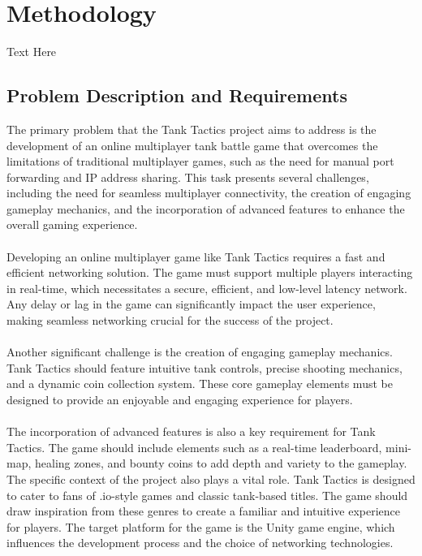 \chapter{Methodology}
\label{ch:method} %
Text Here

\section{Problem Description and Requirements}

The primary problem that the Tank Tactics project aims to address is the development of an online multiplayer tank battle game that overcomes the limitations of traditional multiplayer games, such as the need for manual port forwarding and IP address sharing. This task presents several challenges, including the need for seamless multiplayer connectivity, the creation of engaging gameplay mechanics, and the incorporation of advanced features to enhance the overall gaming experience.
\\
\noindent
\\
Developing an online multiplayer game like Tank Tactics requires a fast and efficient networking solution. The game must support multiple players interacting in real-time, which necessitates a secure, efficient, and low-level latency network. Any delay or lag in the game can significantly impact the user experience, making seamless networking crucial for the success of the project.
\\
\noindent
\\
Another significant challenge is the creation of engaging gameplay mechanics. Tank Tactics should feature intuitive tank controls, precise shooting mechanics, and a dynamic coin collection system. These core gameplay elements must be designed to provide an enjoyable and engaging experience for players.
\\
\noindent
\\
The incorporation of advanced features is also a key requirement for Tank Tactics. The game should include elements such as a real-time leaderboard, mini-map, healing zones, and bounty coins to add depth and variety to the gameplay. The specific context of the project also plays a vital role. Tank Tactics is designed to cater to fans of .io-style games and classic tank-based titles. The game should draw inspiration from these genres to create a familiar and intuitive experience for players. The target platform for the game is the Unity game engine, which influences the development process and the choice of networking technologies.
